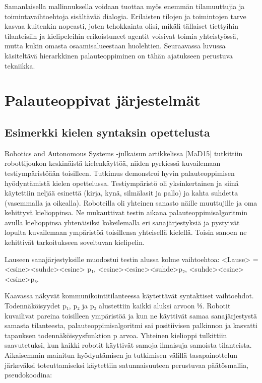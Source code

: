 \documentclass[finnish]{tktltiki2}
\theoremstyle{definition}
\theoremstyle{remark}
\begin{document}
Samanlaisella mallinnuksella voidaan tuottaa myös enemmän tilamuuttujia ja toimintavaihtoehtoja sisältävää dialogia. Erilaisten tilojen ja toimintojen tarve kasvaa kuitenkin nopeasti, joten tehokkainta olisi, mikäli tällaiset tiettyihin tilanteisiin ja kielipeleihin erikoistuneet agentit voisivat toimia yhteistyössä, mutta kukin omasta osaamisalueestaan huolehtien. Seuraavassa luvussa käsiteltävä hierarkkinen palauteoppiminen on tähän ajatukseen perustuva tekniikka.

\section{Palauteoppivat järjestelmät}
\subsection{}
\subsection{Esimerkki kielen syntaksin opettelusta}

Robotics and Autonomous Systems -julkaisun artikkelissa [MaD15] tutkittiin robottijoukon keskinäistä kielenkäyttöä, niiden pyrkiessä kuvailemaan testiympäristöään toisilleen. Tutkimus demonstroi hyvin palauteoppimisen hyödyntämistä kielen opettelussa. Testiympäristö oli yksinkertainen ja siinä käytettiin neljää esinettä (kirja, kynä, silmälasit ja pallo) ja kahta suhdetta (vasemmalla ja oikealla). Roboteilla oli yhteinen sanasto näille muuttujille ja oma kehittyvä kielioppinsa. Ne mukauttivat testin aikana palauteoppimisalgoritmin avulla kielioppinsa yhtenäisiksi kokeilemalla eri sanajärjestyksiä ja pystyivät lopulta kuvailemaan ympäristöä toisillensa yhteisellä kielellä. Toisin sanoen ne kehittivät tarkoitukseen soveltuvan kielipelin.  
 
Lauseen sanajärjestyksille muodostui testin alussa kolme vaihtoehtoa: 
<Lause> = <esine><suhde><esine>    p₁, 
    <esine><esine><suhde>p₂, 
    <suhde><esine><esine>p₃. 
 
Kaavassa näkyvät kommunikointitilanteessa käytettävät syntaktiset vaihtoehdot. Todennäköisyydet p₁, p₂ ja p₃ alustettiin kaikki aluksi arvoon ⅓. Robotit kuvailivat pareina toisilleen ympäristöä ja kun ne käyttivät samaa sanajärjestystä samasta tilanteesta, palauteoppimisalgoritmi sai positiivisen palkinnon ja kasvatti tapauksen todennäköisyysfunktion p arvoa. Yhteinen kielioppi tulkittiin saavutetuksi, kun kaikki robotit käyttivät samoja ilmaisuja samoista tilanteista. Aikaisemmin mainitun hyödyntämisen ja tutkimisen välillä tasapainottelun järkeväksi toteuttamiseksi käytettiin satunnaisuuteen perustuvaa päätösmallia, pseudokoodina: 
 
\end{document}
